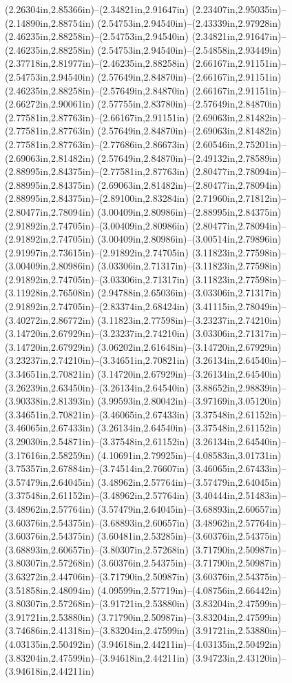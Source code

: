 (2.26304in,2.85366in)--(2.34821in,2.91647in) (2.23407in,2.95035in)--(2.14890in,2.88754in) (2.54753in,2.94540in)--(2.43339in,2.97928in) (2.46235in,2.88258in)--(2.54753in,2.94540in) (2.34821in,2.91647in)--(2.46235in,2.88258in) (2.54753in,2.94540in)--(2.54858in,2.93449in) (2.37718in,2.81977in)--(2.46235in,2.88258in) (2.66167in,2.91151in)--(2.54753in,2.94540in) (2.57649in,2.84870in)--(2.66167in,2.91151in) (2.46235in,2.88258in)--(2.57649in,2.84870in) (2.66167in,2.91151in)--(2.66272in,2.90061in) (2.57755in,2.83780in)--(2.57649in,2.84870in) (2.77581in,2.87763in)--(2.66167in,2.91151in) (2.69063in,2.81482in)--(2.77581in,2.87763in) (2.57649in,2.84870in)--(2.69063in,2.81482in) (2.77581in,2.87763in)--(2.77686in,2.86673in) (2.60546in,2.75201in)--(2.69063in,2.81482in) (2.57649in,2.84870in)--(2.49132in,2.78589in) (2.88995in,2.84375in)--(2.77581in,2.87763in) (2.80477in,2.78094in)--(2.88995in,2.84375in) (2.69063in,2.81482in)--(2.80477in,2.78094in) (2.88995in,2.84375in)--(2.89100in,2.83284in) (2.71960in,2.71812in)--(2.80477in,2.78094in) (3.00409in,2.80986in)--(2.88995in,2.84375in) (2.91892in,2.74705in)--(3.00409in,2.80986in) (2.80477in,2.78094in)--(2.91892in,2.74705in) (3.00409in,2.80986in)--(3.00514in,2.79896in) (2.91997in,2.73615in)--(2.91892in,2.74705in) (3.11823in,2.77598in)--(3.00409in,2.80986in) (3.03306in,2.71317in)--(3.11823in,2.77598in) (2.91892in,2.74705in)--(3.03306in,2.71317in) (3.11823in,2.77598in)--(3.11928in,2.76508in) (2.94788in,2.65036in)--(3.03306in,2.71317in) (2.91892in,2.74705in)--(2.83374in,2.68424in) (3.41115in,2.78049in)--(3.40272in,2.86772in) (3.11823in,2.77598in)--(3.23237in,2.74210in) (3.14720in,2.67929in)--(3.23237in,2.74210in) (3.03306in,2.71317in)--(3.14720in,2.67929in) (3.06202in,2.61648in)--(3.14720in,2.67929in) (3.23237in,2.74210in)--(3.34651in,2.70821in) (3.26134in,2.64540in)--(3.34651in,2.70821in) (3.14720in,2.67929in)--(3.26134in,2.64540in) (3.26239in,2.63450in)--(3.26134in,2.64540in) (3.88652in,2.98839in)--(3.90338in,2.81393in) (3.99593in,2.80042in)--(3.97169in,3.05120in) (3.34651in,2.70821in)--(3.46065in,2.67433in) (3.37548in,2.61152in)--(3.46065in,2.67433in) (3.26134in,2.64540in)--(3.37548in,2.61152in) (3.29030in,2.54871in)--(3.37548in,2.61152in) (3.26134in,2.64540in)--(3.17616in,2.58259in) (4.10691in,2.79925in)--(4.08583in,3.01731in) (3.75357in,2.67884in)--(3.74514in,2.76607in) (3.46065in,2.67433in)--(3.57479in,2.64045in) (3.48962in,2.57764in)--(3.57479in,2.64045in) (3.37548in,2.61152in)--(3.48962in,2.57764in) (3.40444in,2.51483in)--(3.48962in,2.57764in) (3.57479in,2.64045in)--(3.68893in,2.60657in) (3.60376in,2.54375in)--(3.68893in,2.60657in) (3.48962in,2.57764in)--(3.60376in,2.54375in) (3.60481in,2.53285in)--(3.60376in,2.54375in) (3.68893in,2.60657in)--(3.80307in,2.57268in) (3.71790in,2.50987in)--(3.80307in,2.57268in) (3.60376in,2.54375in)--(3.71790in,2.50987in) (3.63272in,2.44706in)--(3.71790in,2.50987in) (3.60376in,2.54375in)--(3.51858in,2.48094in) (4.09599in,2.57719in)--(4.08756in,2.66442in) (3.80307in,2.57268in)--(3.91721in,2.53880in) (3.83204in,2.47599in)--(3.91721in,2.53880in) (3.71790in,2.50987in)--(3.83204in,2.47599in) (3.74686in,2.41318in)--(3.83204in,2.47599in) (3.91721in,2.53880in)--(4.03135in,2.50492in) (3.94618in,2.44211in)--(4.03135in,2.50492in) (3.83204in,2.47599in)--(3.94618in,2.44211in) (3.94723in,2.43120in)--(3.94618in,2.44211in) 
